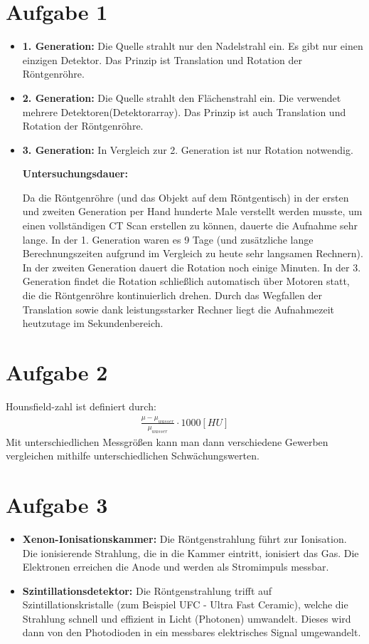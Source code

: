 \section{Aufgabe 1}
\begin{itemize}
    \item \textbf{1. Generation: } Die Quelle strahlt nur den Nadelstrahl ein. Es gibt nur einen einzigen Detektor. Das Prinzip ist Translation und Rotation der Röntgenröhre.
    \item \textbf{2. Generation: } Die Quelle strahlt den Flächenstrahl ein. Die verwendet mehrere Detektoren(Detektorarray). Das Prinzip ist auch Translation und Rotation der Röntgenröhre.
    \item \textbf{3. Generation: } In Vergleich zur 2. Generation ist nur Rotation notwendig.
    
    \textbf{Untersuchungsdauer:}
    
    Da die Röntgenröhre (und das Objekt auf dem Röntgentisch) in der ersten und zweiten Generation per Hand hunderte Male verstellt werden musste, um einen vollständigen CT Scan erstellen zu können, dauerte die Aufnahme sehr lange. In der 1. Generation waren es 9 Tage (und zusätzliche lange Berechnungszeiten aufgrund im Vergleich zu heute sehr langsamen Rechnern). In der zweiten Generation dauert die Rotation noch einige Minuten. In der 3. Generation findet die Rotation schließlich automatisch über Motoren statt, die die Röntgenröhre kontinuierlich drehen. Durch das Wegfallen der Translation sowie dank leistungsstarker Rechner liegt die Aufnahmezeit heutzutage im Sekundenbereich.
    
\end{itemize}


\section{Aufgabe 2}
Hounsfield-zahl ist definiert durch: 
\begin{align*}
\frac{\mu - \mu_{wasser}}{\mu_{wasser}} \cdot 1000[HU]    
\end{align*}
Mit unterschiedlichen Messgrößen kann man dann verschiedene Gewerben vergleichen mithilfe unterschiedlichen Schwächungswerten.

\section{Aufgabe 3}
\begin{itemize}
    \item \textbf{Xenon-Ionisationskammer: } Die Röntgenstrahlung führt zur Ionisation. Die ionisierende Strahlung, die in die Kammer eintritt, ionisiert das Gas. Die Elektronen erreichen die Anode und werden als Stromimpuls messbar. 
    \item \textbf{Szintillationsdetektor: }  Die Röntgenstrahlung trifft auf Szintillationskristalle (zum Beispiel UFC - Ultra Fast Ceramic), welche die Strahlung schnell und effizient in Licht (Photonen) umwandelt. Dieses wird dann von den Photodioden in ein messbares elektrisches Signal umgewandelt.
\end{itemize}

